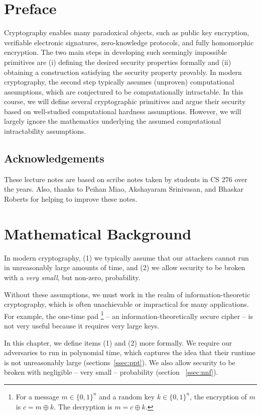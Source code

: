 \documentclass[12pt]{tufte-book}
\begin{document}
\chapter*{Preface}
Cryptography enables many paradoxical objects, such as public key encryption, verifiable electronic signatures, zero-knowledge protocols, and fully homomorphic encryption.  The two main steps in developing such seemingly impossible primitives are (i) defining the desired security properties formally and (ii) obtaining a construction satisfying the security property provably. In modern cryptography, the second step typically assumes (unproven) computational assumptions, which are conjectured to be computationally intractable. In this course, we will define several cryptographic primitives and argue their security based on well-studied computational hardness assumptions. However, we will largely ignore the mathematics underlying the assumed computational intractability assumptions.

\section*{Acknowledgements}
These lecture notes are based on scribe notes taken by students in CS 276 over the years. Also, thanks to Peihan Miao, Akshayaram Srinivasan, and Bhaskar Roberts for helping to improve these notes.
\newcommand{\sanjam}[1]{{\color{red} Sanjam: #1}}

\newcommand{\bhaskar}[1]{{\color{ForestGreen} Bhaskar: #1}}

\mainmatter
\chapter{Mathematical Background}
\label{sec:mb}

In modern cryptography, (1) we typically assume that our attackers cannot run in unreasonably large amounts of time, and (2) we allow security to be broken with a \emph{very small}, but non-zero, probability.

Without these assumptions, we must work in the realm of information-theoretic cryptography, which is often unachievable or impractical for many applications. For example, the one-time pad
\footnote{For a message $m \in \{0,1\}^n$ and a random key $k \in \{0,1\}^n$, the encryption of $m$ is $c = m \oplus k$. The decryption is $m = c \oplus k$.}
-- an information-theoretically secure cipher -- is not very useful because it requires very large keys.

In this chapter, we define items (1) and (2) more formally. We require our adversaries to run in polynomial time, which captures the idea that their runtime is not unreasonably large (sections~\ref{ssec:ppt}). We also allow security to be broken with negligible -- very small -- probability (section ~\ref{ssec:nnf}). 
\end{document}
